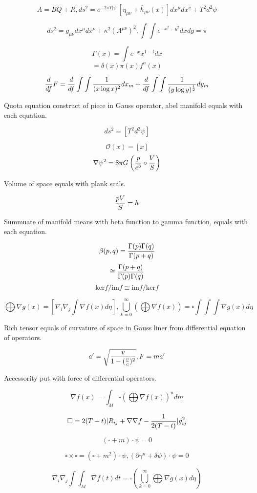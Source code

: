 \documentclass{jsarticle}
\begin{document}
$$ A = BQ + R, ds^2 = e^{-2 \pi T|\psi|}[\eta_{\mu\nu} + \bar{h}_{\mu\nu}(x)]dx^{\mu}dx^{\nu} + T^2 d^2 \psi $$

$$ ds^2 = g_{\mu\nu}dx^{\mu}dx^{\nu} + \kappa^2 (A^{\mu\nu})^2, \int \int e^{-x^2 -y^2}dxdy = \pi $$

$$ \Gamma(x) = \int e^{-x}x^{1 - t}dx $$
$$ = \delta(x)\pi(x)f^n(x) $$

$$ {d \over df}F = {d \over df}\int\int{1 \over (x \log x)^2}dx_m + {d \over df}\int \int{1 \over (y \log y)^
{1 \over 2}}dy_m $$ 

 Quota equation construct of piece in Gauss operator, abel manifold equals with each equation.

 $$ ds^2 = [T^2 d^2 \psi] $$

 $$ \mathcal{O}(x) = [x] $$
 $$ \nabla \psi^2 = 8 \pi G \left({p \over c^3} \circ {V \over S}\right) $$

Volume of space equals with plank scals.

$$ {pV \over S} = h $$

  Summuate of manifold means with beta function to gamma function, equals with each equation.

  $$ \beta(p,q) = {\Gamma(p)\Gamma(q) \over \Gamma(p + q)} $$
  $$ \cong {\Gamma(p + q) \over \Gamma(p)\Gamma(q)} $$
  $$ \mathrm{ker}f/\mathrm{im}f \cong \mathrm{im}f/\mathrm{ker}f $$

  $$ \bigoplus \nabla g(x) = [\nabla_{i}\nabla_{j} \int \nabla f(x) d \eta],
  \bigcup_{k=0}^{\infty} \left( \bigoplus \nabla f(x) \right) = \square \int \int \int \nabla g(x) d \eta $$

  Rich tensor equals of curvature of space in Gauss liner from differential equation of operators. 

  $$ a' = \sqrt{{v \over 1 - {({v \over c})^2}}}, F= ma' $$

  Accessority put with force of differential operators.

  $$ \nabla f(x) = \int_M \square \left(\bigoplus \nabla f(x) \right)^n dm $$

  $$ \square = 2 (T - t)|R_{ij} + \nabla \nabla f - {1 \over 2(T - t)}|g^2_{ij} $$

  $$ (\square + m)\cdot \psi = 0 $$

  $$ \square \times \square = (\square + m^2)\cdot \psi, (\partial \gamma^n + \delta \psi)\cdot \psi = 0 $$

  $$ \nabla_{i}\nabla_{j}\int \int_M \nabla f(t)dt = \square \left(\bigcup_{k=0}^{\infty}
  \bigoplus \nabla g(x) d \eta \right) $$
\end{document}
